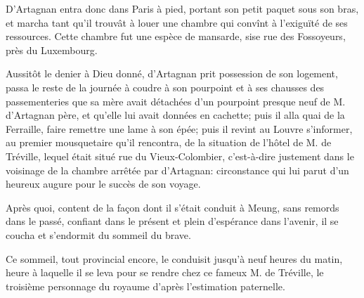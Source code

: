 D'Artagnan entra donc dans Paris à pied, portant son petit paquet sous son bras, et marcha tant qu'il trouvât à louer une chambre qui convînt à l'exiguïté de ses ressources. Cette chambre fut une espèce de mansarde, sise rue des Fossoyeurs, près du Luxembourg. 

Aussitôt le denier à Dieu donné, d'Artagnan prit possession de son logement, passa le reste de la journée à coudre à son pourpoint et à ses chausses des passementeries que sa mère avait détachées d'un pourpoint presque neuf de M. d'Artagnan père, et qu'elle lui avait données en cachette; puis il alla quai de la Ferraille, faire remettre une lame à son épée; puis il revint au Louvre s'informer, au premier mousquetaire qu'il rencontra, de la situation de l'hôtel de M. de Tréville, lequel était situé rue du Vieux-Colombier, c'est-à-dire justement dans le voisinage de la chambre arrêtée par d'Artagnan: circonstance qui lui parut d'un heureux augure pour le succès de son voyage. 

Après quoi, content de la façon dont il s'était conduit à Meung, sans remords dans le passé, confiant dans le présent et plein d'espérance dans l'avenir, il se coucha et s'endormit du sommeil du brave. 

Ce sommeil, tout provincial encore, le conduisit jusqu'à neuf heures du matin, heure à laquelle il se leva pour se rendre chez ce fameux M. de Tréville, le troisième personnage du royaume d'après l'estimation paternelle. 

